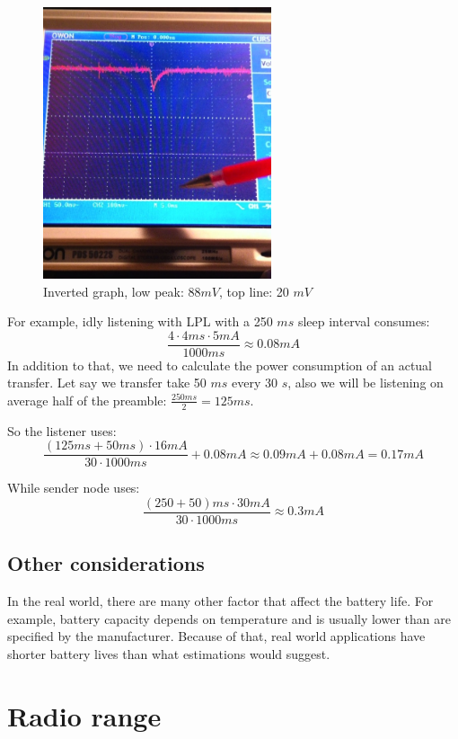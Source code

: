 \begin{figure}[h]
  \centering
  \includegraphics[width=0.6\textwidth]{img/low_power_receive_check.jpg}
  \caption{Inverted graph, low peak: $ 88 mV$, top line: 20 $ mV $}
  \label{fig:low_power_receive_check}
\end{figure}

For example, idly listening with LPL with a 250 $ ms $ sleep interval consumes:
$$
\frac{4 \cdot 4 ms \cdot 5 mA}{1000 ms} \approx 0.08 mA
$$
In addition to that, we need to calculate the power consumption of an actual transfer.
Let say we transfer take 50 $ ms $ every 30 $ s $, also we will be listening on average half of the preamble: $\frac{250 ms}{2} =  125 ms$.

So the listener uses:
$$
\frac{(125 ms + 50 ms) \cdot 16 mA}{30 \cdot 1000 ms}  + 0.08 mA \approx 0.09 mA + 0.08 mA = 0.17 mA
$$

While sender node uses:
$$
\frac{(250 + 50) ms \cdot 30 mA}{30 \cdot 1000 ms} \approx 0.3 mA
$$

\subsection{Other considerations}
In the real world, there are many other factor that affect the battery life.
For example, battery capacity depends on temperature and is usually lower than are specified by the manufacturer.
Because of that, real world applications have shorter battery lives than what estimations would suggest.


\section{Radio range}

